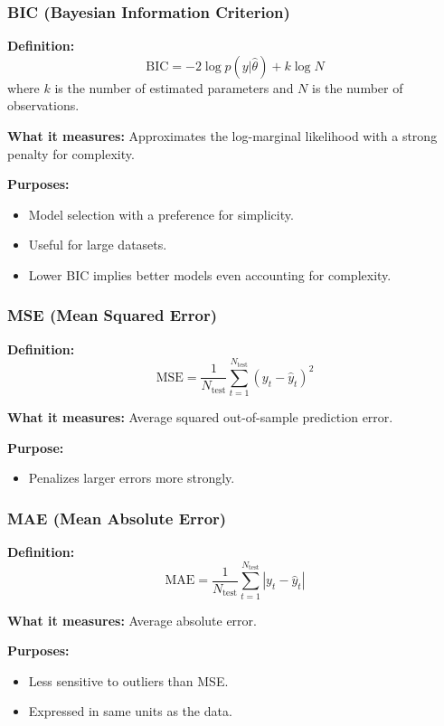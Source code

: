 \documentclass{Configuration_Files/PoliMi3i_thesis}
\begin{document}
\subsubsection{BIC (Bayesian Information Criterion)}
\vspace{0.5em}
\textbf{Definition:}
\[
\text{BIC} = -2 \log p(y | \hat{\theta}) + k \log N
\]
where $k$ is the number of estimated parameters and $N$ is the number of observations.

\textbf{What it measures:}  
Approximates the log-marginal likelihood with a strong penalty for complexity.

\textbf{Purposes:}
\begin{itemize}
  \item Model selection with a preference for simplicity.
  \item Useful for large datasets.
  \item Lower BIC implies better models even accounting for complexity.
\end{itemize}

\subsubsection{MSE (Mean Squared Error)}
\vspace{0.5em}
\textbf{Definition:}
\[
\text{MSE} = \frac{1}{N_{\text{test}}} \sum_{t=1}^{N_{\text{test}}} (y_t - \hat{y}_t)^2
\]

\textbf{What it measures:}  
Average squared out-of-sample prediction error.

\textbf{Purpose:}
\begin{itemize}
  \item Penalizes larger errors more strongly.
\end{itemize}

\subsubsection{MAE (Mean Absolute Error)}
\vspace{0.5em}
\textbf{Definition:}
\[
\text{MAE} = \frac{1}{N_{\text{test}}} \sum_{t=1}^{N_{\text{test}}} |y_t - \hat{y}_t|
\]

\textbf{What it measures:}  
Average absolute error.

\textbf{Purposes:}
\begin{itemize}
  \item Less sensitive to outliers than MSE.
  \item Expressed in same units as the data.
\end{itemize}
\newpage
\end{document}
